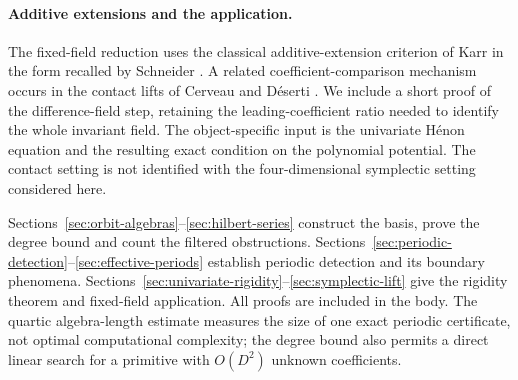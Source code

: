 \paragraph{Additive extensions and the application.}
The fixed-field reduction uses the classical additive-extension criterion
of Karr in the form recalled by Schneider
\citep{Schneider2016DifferenceRings}. A related coefficient-comparison
mechanism occurs in the contact lifts of Cerveau and D\'eserti
\citep{CerveauDeserti2018Contact}. We include a short proof of the
difference-field step, retaining the leading-coefficient ratio needed
to identify the whole invariant field. The object-specific input is
the univariate H\'enon equation and the resulting exact condition on
the polynomial potential. The contact setting is not identified with
the four-dimensional symplectic setting considered here.

Sections~\ref{sec:orbit-algebras}--\ref{sec:hilbert-series} construct
the basis, prove the degree bound and count the filtered obstructions.
Sections~\ref{sec:periodic-detection}--\ref{sec:effective-periods}
establish periodic detection and its boundary phenomena.
Sections~\ref{sec:univariate-rigidity}--\ref{sec:symplectic-lift}
give the rigidity theorem and fixed-field application. All proofs are
included in the body. The quartic algebra-length estimate measures the
size of one exact periodic certificate, not optimal computational
complexity; the degree bound also permits a direct linear search for a
primitive with $O(D^2)$ unknown coefficients.
